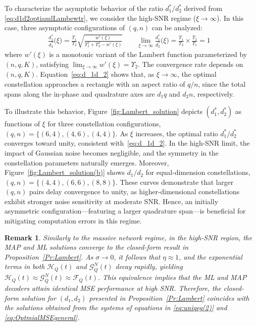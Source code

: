 \documentclass[journal,12pt,onecolumn,draftclsnofoot]{IEEEtran}
\newtheorem{remark}{Remark}
\theoremstyle{definition}
\begin{document}
To characterize the asymptotic behavior of the ratio $d_1^*/d_2^*$ derived from \eqref{eq:d1d2optiamlLambewtr}, we consider the high-SNR regime ($\xi \to \infty$). 
In this case, three asymptotic configurations of $(q, n)$ can be analyzed:
\begin{align}\label{eq:d_1d_2}
    \frac{d_1^*}{d_2^*}\Big(\xi\Big)=  \frac{\Upsilon_1}{\Upsilon_2} \sqrt{\frac{w'(\xi)}{\Upsilon_1^2+ \Upsilon_2^2-w'(\xi)}}\qquad  \lim_{\xi \rightarrow \infty} \frac{d_1^*}{d_2^*}\Big(\xi\Big)= \frac{\Upsilon_1}{\Upsilon_2}\times  \frac{\Upsilon_2}{\Upsilon_1} =1
\end{align}
where $w'(\xi)$ is a monotonic variant of the Lambert function parameterized by $(n, q, K)$, satisfying $\lim_{\xi \to \infty} w'(\xi) = \Upsilon_2$. 
The convergence rate depends on $(n, q, K)$. 
Equation~\eqref{eq:d_1d_2} shows that, as $\xi \to \infty$, the optimal constellation approaches a rectangle with an aspect ratio of $q/n$, since the total spans along the in-phase and quadrature axes are $d_1 q$ and $d_2 n$, respectively.

To illustrate this behavior, Figure~\ref{fig:Lambert_solution} depicts $(d_1^*, d_2^*)$ as functions of $\xi$ for three constellation configurations, $(q,n) = \{(6,4), (4,6), (4,4)\}$. 
As $\xi$ increases, the optimal ratio $d_1^*/d_2^*$ converges toward unity, consistent with~\eqref{eq:d_1d_2}.  In the high-SNR limit, the impact of Gaussian noise becomes negligible, and the symmetry in the constellation parameters naturally emerges.   Moreover, Figure~\ref{fig:Lambert_solution(b)} shows $d_1/d_2$ for equal-dimension constellations, $(q,n) = \{(4,4),(6,6), (8,8)\}$. 
These curves demonstrate that larger $(q,n)$ pairs delay convergence to unity, as higher-dimensional constellations exhibit stronger noise sensitivity at moderate SNR. 
Hence, an initially asymmetric configuration—featuring a larger quadrature span—is beneficial for mitigating computation errors in this regime.
 

\begin{remark}\label{rem:highsnreffect}
Similarly to the massive network regime, in the high-SNR region, the MAP and ML solutions converge to the closed-form result in Proposition~\ref{Pr:Lambert}.  As $\sigma \to 0$, it follows that $\eta \approx 1$, and the exponential terms in both $\mathcal{H}_Q(t)$ and $\mathcal{G}_Q^{N}(t)$ decay rapidly, yielding $\mathcal{H}_Q(t) \approx \mathcal{G}_Q^{N}(t) \approx \mathcal{F}_Q(t)$.  This equivalence implies that the ML and MAP decoders attain identical MSE performance at high SNR. Therefore, the closed-form solution for $(d_1, d_2)$ presented in Proposition~\ref{Pr:Lambert} coincides with the solutions obtained from the systems of equations in \eqref{eq:uniqeg(2)} and \eqref{eq:OptmialMSEgeneral}.
\end{remark}
\end{document}
